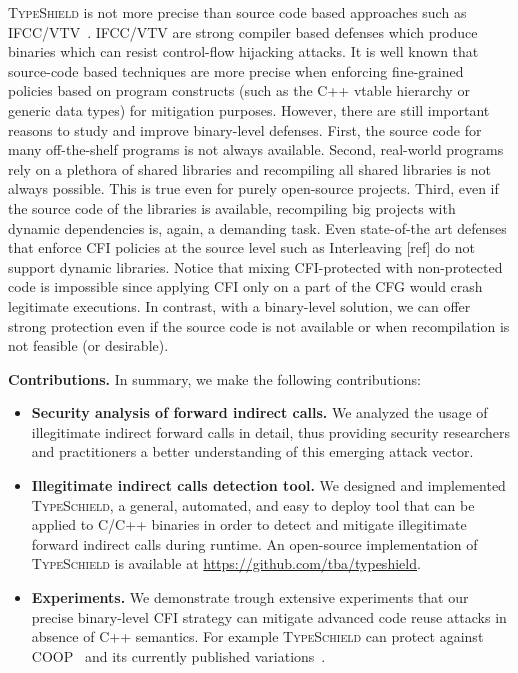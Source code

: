 \textsc{TypeShield} is not more precise than source code based
approaches such as IFCC/VTV~\cite{vtv:tice}.
IFCC/VTV are strong compiler based defenses which produce binaries which can resist control-flow
hijacking attacks. It is well known that source-code based techniques are more precise 
when enforcing fine-grained policies based on program constructs (such as
the C++ vtable hierarchy or generic data types) for mitigation
purposes. However, there are still important reasons to study
and improve binary-level defenses. First, the source code
for many off-the-shelf programs is not always available.
Second, real-world programs rely on a plethora of shared
libraries and recompiling all shared libraries is not always
possible. This is true even for purely open-source projects.
Third, even if the source code of the libraries is
available, recompiling big projects with dynamic dependencies is, 
again, a demanding task. Even state-of-the art
defenses that enforce CFI policies at the source level such
as Interleaving [ref] do not support dynamic libraries.
Notice that mixing CFI-protected with non-protected code is impossible since
applying CFI only on a part of the CFG would crash legitimate executions.
In contrast, with a binary-level solution, we
can offer strong protection even if the source code is not
available or when recompilation is not feasible (or desirable).


\textbf{Contributions.} In summary, we make the following contributions:
\label{Contribution}
\begin{itemize}
 \item \textbf{Security analysis of forward indirect calls.} 
 We analyzed the usage of illegitimate indirect forward calls in detail,
 thus providing security researchers and
practitioners a better understanding of this emerging
attack vector.

 \item \textbf{Illegitimate indirect calls detection tool.}
 We designed and implemented \textsc{TypeSchield}, a general, automated, and easy to deploy tool
 that can be applied to C/C++ binaries in order to detect and mitigate illegitimate forward indirect calls 
 during runtime. An open-source implementation of \textsc{TypeSchield} is available at \url{https://github.com/tba/typeshield}.
 
 \item \textbf{Experiments.} We demonstrate trough extensive experiments that our precise
 binary-level CFI strategy can mitigate advanced code reuse attacks in absence of C++ semantics.
 For example \textsc{TypeSchield} can protect against COOP~\cite{schuster:coop} and its currently published 
 variations~\cite{ctf:coop, crane:readactor++, loop:oriented, subversive-c:lettner}.
  
\end{itemize}

